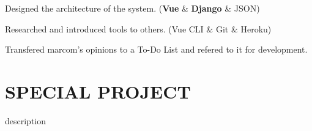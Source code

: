\documentclass[]{resume}
\begin{document}
\begin{minipage}[t]{0.69\textwidth}
\begin{tightemize}
\item Designed the architecture of the system. ({\bf Vue} \& {\bf Django} \& JSON)
\item Researched and introduced tools to others. (Vue CLI \& Git \& Heroku)
\item Transfered marcom's opinions to a To-Do List and refered to it for development.
\end{tightemize}
\sectionsep


\section{SPECIAL PROJECT}
description
\sectionsep

\end{minipage} 
\end{document}
